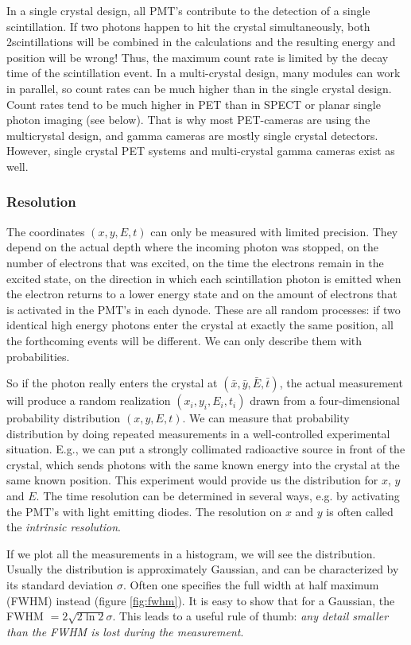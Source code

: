 \documentclass[11pt,oneside]{article}
\begin{document}
In a single crystal design, all PMT's contribute to the detection of a single
scintillation. If two photons happen to hit the crystal simultaneously, both
2scintillations will be combined in the calculations and the resulting energy
and position will be wrong! Thus, the maximum count rate is limited by the
decay time of the scintillation event. In a multi-crystal design, many modules
can work in parallel, so count rates can be much higher than in the single
crystal design. Count rates tend to be much higher in PET than in SPECT or
planar single photon imaging (see below). That is why most PET-cameras are
using the multicrystal design, and gamma cameras are mostly single crystal
detectors. However, single crystal PET systems and multi-crystal gamma cameras
exist as well.


\subsubsection{Resolution} \label{sec:resolution}
The coordinates $(x, y, E, t)$ can only be measured with limited precision.
They depend on the actual depth where the incoming photon was stopped, on
the number of electrons that was excited, on the time the electrons remain
in the excited state, on the direction in which each scintillation photon is
emitted when the electron returns to a lower energy state and on the amount of
electrons that is activated in the PMT's in each dynode. These are all
random processes: if two identical high energy photons enter the crystal at
exactly the same position, all the forthcoming events will be different. We
can only describe them with probabilities.

So if the photon really enters the crystal at $(\bar{x}, \bar{y}, \bar{E},
\bar{t})$, the actual measurement will produce a random realization $(x_i,
y_i, E_i, t_i)$ drawn from a four-dimensional probability distribution
$(x, y, E, t)$. We can measure that probability distribution by doing
repeated measurements in a well-controlled experimental situation. E.g., we
can put a strongly collimated radioactive source in front of the crystal,
which sends photons with the same known energy into the crystal at the same
known position. This experiment would provide us the distribution for $x$,
$y$ and $E$. The time resolution can be determined in several ways, e.g. by
activating the PMT's with light emitting diodes. The resolution on $x$ and $y$
is often called the {\em intrinsic resolution}.

If we plot all the measurements in a histogram, we will see the
distribution. Usually the distribution is approximately Gaussian, and can be
characterized by its standard deviation $\sigma$. Often one specifies the
full width at half maximum (FWHM) instead (figure \ref{fig:fwhm}). It is easy
to show that for a Gaussian, the FWHM $ = 2 \sqrt{2 \ln 2} \sigma$. This
leads to a useful rule of thumb: {\em any detail smaller than the FWHM is lost
during the measurement}.
 
\end{document}
